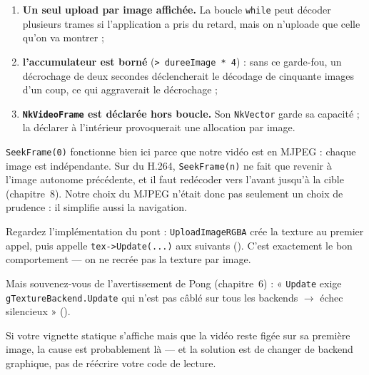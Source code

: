 \begin{nkretenir}
\begin{enumerate}
  \item \textbf{Un seul upload par image affichée.} La boucle \texttt{while}
        peut décoder plusieurs trames si l'application a pris du retard, mais on
        n'uploade que celle qu'on va montrer ;
  \item \textbf{l'accumulateur est borné} (\texttt{> dureeImage * 4}) : sans ce
        garde-fou, un décrochage de deux secondes déclencherait le décodage de
        cinquante images d'un coup, ce qui aggraverait le décrochage ;
  \item \textbf{\texttt{NkVideoFrame} est déclarée hors boucle.} Son
        \texttt{NkVector} garde sa capacité ; la déclarer à l'intérieur
        provoquerait une allocation par image.
\end{enumerate}
\end{nkretenir}

\begin{nkpiege}
\texttt{SeekFrame(0)} fonctionne bien ici parce que notre vidéo est en MJPEG :
chaque image est indépendante. Sur du H.264, \texttt{SeekFrame(n)} ne fait que
revenir à l'image autonome précédente, et il faut redécoder vers l'avant
jusqu'à la cible (chapitre~8). Notre choix du MJPEG n'était donc pas seulement
un choix de prudence : il simplifie aussi la navigation.
\end{nkpiege}

\begin{nkpiege}
Regardez l'implémentation du pont : \texttt{UploadImageRGBA} crée la texture au
premier appel, puis appelle \texttt{tex->Update(...)} aux suivants
().
C'est exactement le bon comportement — on ne recrée pas la texture par image.

Mais souvenez-vous de l'avertissement de Pong (chapitre~6) : « \texttt{Update}
exige \texttt{gTextureBackend.Update} qui n'est pas câblé sur tous les backends
$\rightarrow$ échec silencieux » ().

Si votre vignette statique s'affiche mais que la vidéo reste figée sur sa
première image, la cause est probablement là — et la solution est de changer de
backend graphique, pas de réécrire votre code de lecture.
\end{nkpiege}

